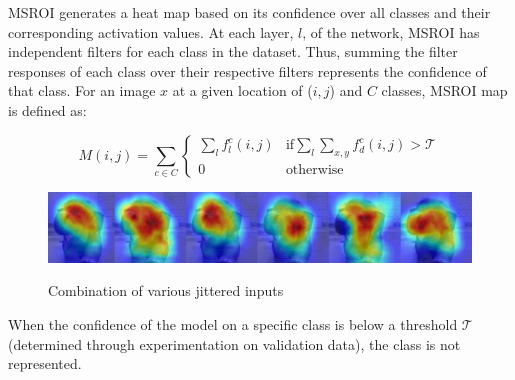 MSROI generates a heat map based on its confidence over all classes and their corresponding activation values. 
At each layer, $l$, of the network, MSROI has independent filters for each class in the dataset. 
Thus, summing the filter responses of each class over their respective filters represents the confidence of that class. 
For an image $x$ at a given location of ($i,j$) and $C$ classes, MSROI map is defined as:

\[
M(i,j) = \sum_{c \in C} \begin{cases}
                        \sum_l f_l^c(i,j) & \text{if} \sum_{l} \sum_{x,y} f_d^c(i,j) > \mathcal{T} \\
                        0 & \text{otherwise}
                        \end{cases}
\]

\begin{figure}[H]
\includegraphics[scale=0.4]{figures/protect/out2_small_small.png}
     \label{fig:combination}
          \caption[Combination of various jittered inputs]{Combination of various jittered inputs}
 \end{figure}


When the confidence of the model on a specific class is below a threshold $\mathcal{T}$ (determined through experimentation on validation data), the class is not represented. 

